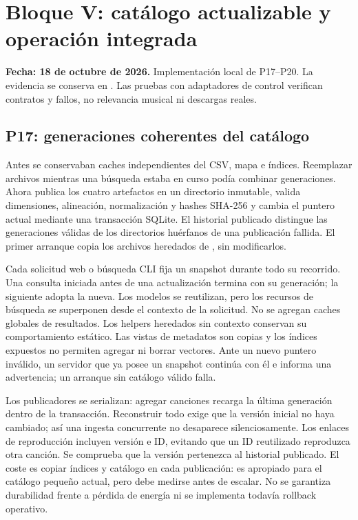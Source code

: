 \section{Bloque V: catálogo actualizable y operación integrada}
\label{sec:bloque5}
\textbf{Fecha: 18 de octubre de 2026.} Implementación local de P17--P20.
La evidencia se conserva en . Las pruebas con adaptadores
de control verifican contratos y fallos, no relevancia musical ni descargas reales.

\subsection{P17: generaciones coherentes del catálogo}
Antes se conservaban caches independientes del CSV, mapa e índices. Reemplazar
archivos mientras una búsqueda estaba en curso podía combinar generaciones.
Ahora  publica los cuatro artefactos en un directorio inmutable,
valida dimensiones, alineación, normalización y hashes SHA-256 y cambia el puntero
actual mediante una transacción SQLite. El historial publicado distingue las
generaciones válidas de los directorios huérfanos de una publicación fallida.
El primer arranque copia los archivos heredados de , sin modificarlos.

Cada solicitud web o búsqueda CLI fija un snapshot durante todo su recorrido.
Una consulta iniciada antes de una actualización termina con su generación; la
siguiente adopta la nueva. Los modelos se reutilizan, pero los recursos de búsqueda
se superponen desde el contexto de la solicitud. No se agregan caches globales de
resultados. Los helpers heredados sin contexto conservan su comportamiento estático.
Las vistas de metadatos son copias y los índices expuestos no permiten agregar ni
borrar vectores. Ante un nuevo puntero inválido, un servidor que ya posee un snapshot
continúa con él e informa una advertencia; un arranque sin catálogo válido falla.

Los publicadores se serializan: agregar canciones recarga la última generación
dentro de la transacción. Reconstruir todo exige que la versión inicial no haya
cambiado; así una ingesta concurrente no desaparece silenciosamente. Los enlaces
de reproducción incluyen versión e ID, evitando que un ID reutilizado reproduzca
otra canción. Se comprueba que la versión pertenezca al historial publicado.
El coste es copiar índices y catálogo en cada publicación: es apropiado para el
catálogo pequeño actual, pero debe medirse antes de escalar. No se garantiza
durabilidad frente a pérdida de energía ni se implementa todavía rollback operativo.

